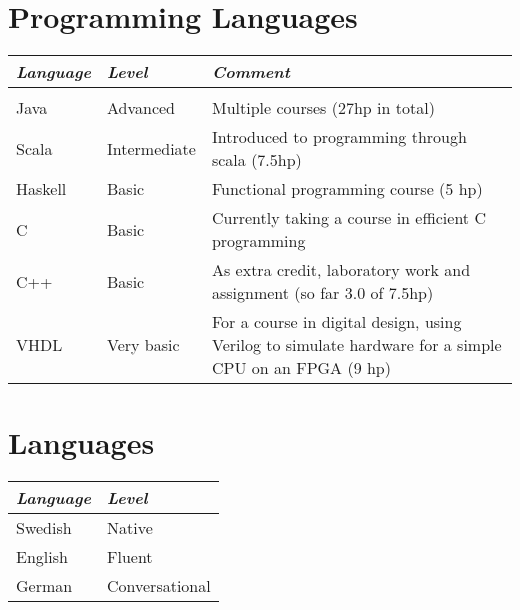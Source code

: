 \documentclass{cv}
\begin{document}
\section{Programming Languages}
\begin{tabular*}{\textwidth}{p{2.7cm}   p{3.7cm} p{11cm}  }
	\textit{Language} & \textit{Level} & \textit{Comment} \\ \hline \\
	
	Java  	& Advanced 	   & Multiple courses (27hp in total)  \\
	Scala 	& Intermediate & Introduced to programming through scala (7.5hp)\\
	Haskell & Basic        & Functional programming course (5 hp) \\
	C 		& Basic        & Currently taking a course in efficient C programming \\
	C++ 	& Basic        & As extra credit, laboratory work and assignment (so far 3.0 of 7.5hp) \\
	VHDL 	& Very basic   & For a course in digital design, using Verilog to simulate hardware for a simple CPU on an FPGA (9 hp) \\
	
	\end{tabular*}

\section{Languages}

\begin{tabular*}{\textwidth}{p{2.7cm}   p{3.7cm}  }
	\textit{Language} & \textit{Level}  \\ \hline
	Swedish & Native  			\\
	English & Fluent  			\\
	German  & Conversational	\\
\end{tabular*}
\end{document}
